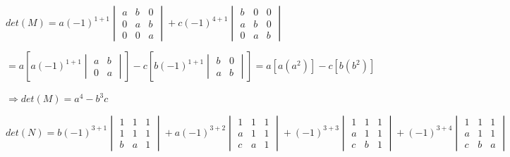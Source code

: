 \documentclass[fleqn]{article}
\begin{document}
\begin{enumerate}
      \textcolor{hwColor}{
        $
        det(M)=
        a(-1)^{1+1}
        \begin{vmatrix}
          a & b & 0 \\
          0 & a & b \\
          0 & 0 & a 
        \end{vmatrix}
        +
        c(-1)^{4+1}
        \begin{vmatrix}
          b & 0 & 0 \\
          a & b & 0 \\
          0 & a & b
        \end{vmatrix}
        $
      }

      \textcolor{hwColor}{
        $=a\left[a(-1)^{1+1}
        \begin{vmatrix}
          a & b \\
          0 & a
        \end{vmatrix}\right]
        -c\left[b(-1)^{1+1}
        \begin{vmatrix}
          b & 0 \\
          a & b
        \end{vmatrix}\right]
        =a\left[a(a^2)\right]-c\left[b(b^2)\right]
        $
      }

      \textcolor{hwColor}{
        $
        \Longrightarrow
        det(M)=a^4-b^3c
        $
      }

      \bigbreak

      \textcolor{hwColor}{
        $
        det(N)=b(-1)^{3+1}
        \begin{vmatrix}
          1 & 1 & 1 \\
          1 & 1 & 1 \\
          b & a & 1
        \end{vmatrix}
        +a(-1)^{3+2}
        \begin{vmatrix}
          1 & 1 & 1 \\
          a & 1 & 1 \\
          c & a & 1
        \end{vmatrix}
        +(-1)^{3+3}
        \begin{vmatrix}
          1 & 1 & 1 \\
          a & 1 & 1 \\
          c & b & 1
        \end{vmatrix}
        +(-1)^{3+4}
        \begin{vmatrix}
          1 & 1 & 1 \\
          a & 1 & 1 \\
          c & b & a
        \end{vmatrix}
        $
      }


\end{enumerate}
\end{document}
